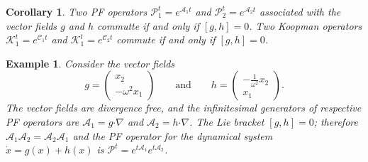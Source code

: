 \documentclass[pdflatex,sn-mathphys]{sn-jnl}%
\newtheorem{corollary}{Corollary}
\newcommand{\C}{\mathcal{C}}
\newcommand{\K}{\mathcal{K}}
\theoremstyle{thmstyleone}%
\theoremstyle{thmstyletwo}%
\newtheorem{example}{Example}%
\theoremstyle{thmstylethree}%
\begin{document}
\begin{corollary}
Two PF operators  $\mathcal{P}_1^t = e^{\mathcal{A}_1t}$ and $\mathcal{P}_2^t = e^{\mathcal{A}_2t}$ associated with the vector fields $g$ and $h$ commutte if and only if $[g,h]=0$.  Two Koopman operators $\K_1^t = e^{\C_1t}$ and $\K_1^t = e^{\C_2t}$ commute if and only if $[g,h] =0$.
\end{corollary}

\begin{example}
    Consider the vector fields
    \[
    g = \begin{pmatrix}
    x_2\\
    -\omega^2 x_1
    \end{pmatrix} \quad \quad \text{and} \quad \quad 
    h= \begin{pmatrix}
    -\frac{1}{\omega^2} x_2\\
    x_1
    \end{pmatrix}.
    \]
    The vector fields are divergence free, and the infinitesimal generators of respective PF operators are $\mathcal{A}_1 = g \boldsymbol{\cdot} \nabla$ and $\mathcal{A}_2 = h \boldsymbol{\cdot} \nabla$. The Lie bracket $[g,h]=0$; therefore $\mathcal{A}_1\mathcal{A}_2 = \mathcal{A}_2\mathcal{A}_1$ and the PF operator for the dynamical system $\dot{x} = g(x)+h(x)$ is $\mathcal{P}^t = e^{t\mathcal{A}_1}e^{t\mathcal{A}_2}$.
\end{example}
\end{document}

